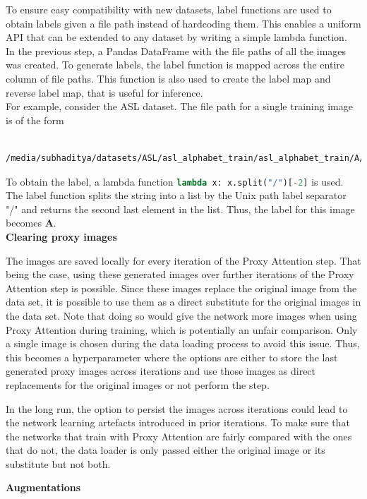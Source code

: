 To ensure easy compatibility with new datasets, label functions are used to obtain labels given a file path instead of hardcoding them. This enables a uniform API that can be extended to any dataset by writing a simple lambda function.\\
In the previous step, a Pandas DataFrame with the file paths of all the images was created. To generate labels, the label function is mapped across the entire column of file paths. This function is also used to create the label map and reverse label map, that is useful for inference.\\
For example, consider the ASL dataset. The file path for a single training image is of the form \begin{verbatim}
    /media/subhaditya/datasets/ASL/asl_alphabet_train/asl_alphabet_train/A/A1.jpg
\end{verbatim} To obtain the label, a lambda function
\lstinline[language=Python]{lambda x: x.split("/")[-2]}
is used.
The label function splits the string into a list by the Unix path label separator "/" and returns the second last element in the list. Thus, the label for this image becomes \textbf{A}.\\


\textbf{Clearing proxy images} \label{sec:clearing_proxy_images}

The images are saved locally for every iteration of the Proxy Attention step. That being the case, using these generated images over further iterations of the Proxy Attention step is possible. Since these images replace the original image from the data set, it is possible to use them as a direct substitute for the original images in the data set.  Note that doing so would give the network more images when using Proxy Attention during training, which is potentially an unfair comparison. Only a single image is chosen during the data loading process to avoid this issue. Thus, this becomes a hyperparameter where the options are either to store the last generated proxy images across iterations and use those images as direct replacements for the original images or not perform the step.

In the long run, the option to persist the images across iterations could lead to the network learning artefacts introduced in prior iterations. To make sure that the networks that train with Proxy Attention are fairly compared with the ones that do not, the data loader is only passed either the original image or its substitute but not both.

\textbf{Augmentations}

